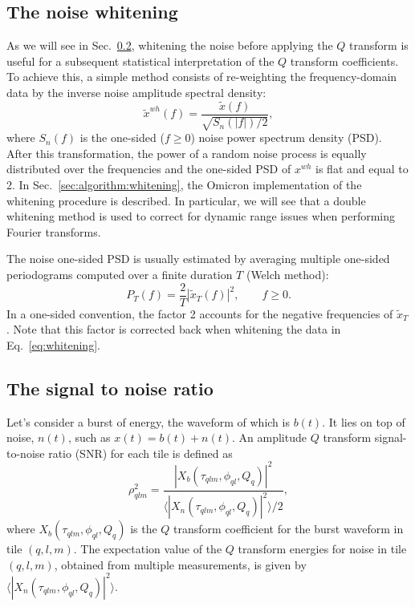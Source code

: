 \subsection{The noise whitening} \label{sec:method:whitening}

As we will see in Sec.~\ref{sec:method:snr}, whitening the noise before applying the $Q$ transform is useful for a subsequent statistical interpretation of the $Q$ transform coefficients. To achieve this, a simple method consists of re-weighting the frequency-domain data by the inverse noise amplitude spectral density:
\begin{equation}
  \tilde{x}^{wh}(f) = \frac{\tilde{x}(f)}{\sqrt{S_n(|f|)/2}},
  \label{eq:whitening}
\end{equation}
where $S_n(f)$ is the one-sided ($f \ge 0$) noise power spectrum density (PSD). After this transformation, the power of a random noise process is equally distributed over the frequencies and the one-sided PSD of $x^{wh}$ is flat and equal to 2. In Sec.~\ref{sec:algorithm:whitening}, the Omicron implementation of the whitening procedure is described. In particular, we will see that a double whitening method is used to correct for dynamic range issues when performing Fourier transforms.

The noise one-sided PSD is usually estimated by averaging multiple one-sided periodograms computed over a finite duration $T$ (Welch method):
\begin{equation}
  P_T(f) = \frac{2}{T}\left|\tilde{x}_T(f)\right|^2, \qquad f \ge 0.
  \label{eq:periodogram}
\end{equation}
In a one-sided convention, the factor 2 accounts for the negative frequencies of $\tilde{x}_T$. Note that this factor is corrected back when whitening the data in Eq.~\ref{eq:whitening}.


\subsection{The signal to noise ratio} \label{sec:method:snr}

Let's consider a burst of energy, the waveform of which is $b(t)$. It lies on top of noise, $n(t)$, such as $x(t) = b(t) + n(t)$. An amplitude $Q$ transform signal-to-noise ratio (SNR) for each tile is defined as
\begin{equation}
  \rho_{qlm}^2 =  \frac{|X_b(\tau_{qlm}, \phi_{ql}, Q_q)|^2}{\langle |X_n(\tau_{qlm}, \phi_{ql}, Q_q)|^2 \rangle/2}, \label{eq:snrdef}
\end{equation}
where $X_b(\tau_{qlm}, \phi_{ql}, Q_q)$ is the $Q$ transform coefficient for the burst waveform in tile $(q,l,m)$. The expectation value of the $Q$ transform energies for noise in tile $(q,l,m)$, obtained from multiple measurements, is given by $\langle |X_n(\tau_{qlm}, \phi_{ql}, Q_q)|^2\rangle$.

